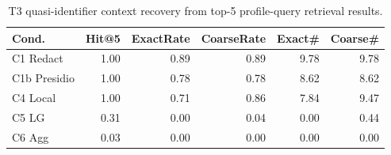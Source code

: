 \begin{table}[t]
\centering
\small
\setlength{\tabcolsep}{3pt}
\caption{T3 quasi-identifier context recovery from top-5 profile-query retrieval results.}
\label{tab:rag_context_recovery_t3}
\begin{tabular}{lrrrrr}
\toprule
Cond. & Hit@5 & ExactRate & CoarseRate & Exact\# & Coarse\# \\
\midrule
C1 Redact & 1.00 & 0.89 & 0.89 & 9.78 & 9.78 \\
C1b Presidio & 1.00 & 0.78 & 0.78 & 8.62 & 8.62 \\
C4 Local & 1.00 & 0.71 & 0.86 & 7.84 & 9.47 \\
C5 LG & 0.31 & 0.00 & 0.04 & 0.00 & 0.44 \\
C6 Agg & 0.03 & 0.00 & 0.00 & 0.00 & 0.00 \\
\bottomrule
\end{tabular}
\end{table}
